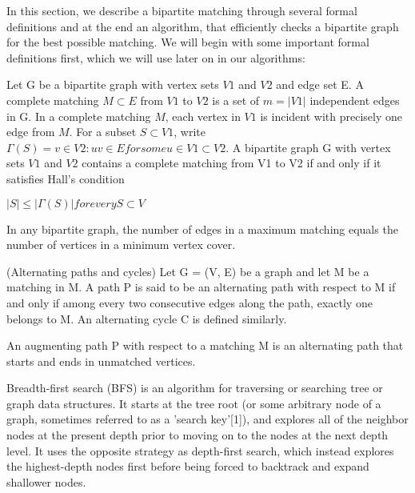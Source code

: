 In this section, we describe a bipartite matching through several formal definitions and at the end an algorithm, that efficiently checks a bipartite graph for the best possible matching. We will begin with some important formal definitions first, which we will use later on in our algorithms:

\begin{definition}
Let G be a bipartite graph with vertex sets $V1$ and $V2$ and edge set E. A complete
matching $M \subset E$ from $V1$ to $V2$ is a set of $m = |V1|$ independent edges in G. In a complete
matching $M$, each vertex in $V1$ is incident with precisely one edge from $M$.
For a subset $S \subset V1$, write \newline \newline
$\Gamma(S) = {v \in V2 : uv \in E for some u \in V1} \subset V2$.  \newline  \newline
A bipartite graph G with vertex sets $V1$ and $V2$ contains a complete matching
from V1 to V2 if and only if it satisfies Hall’s condition

$|S| \leq |\Gamma(S)|  for every S \subset V$
\end{definition}

\begin{definition}
In any bipartite graph, the number of edges in a maximum matching equals the number of vertices in a minimum vertex cover.
\end{definition}

\begin{definition}
(Alternating paths and cycles) Let G = (V, E) be a graph and let M be a matching in M. A path P is said to be an alternating path with respect to M if and only if among every two consecutive edges along the path, exactly one belongs to M. An alternating cycle C is defined similarly.

An augmenting path P with respect to a matching M is an alternating path that starts and ends in unmatched vertices.

\end{definition}

\begin{definition}

Breadth-first search (BFS) is an algorithm for traversing or searching tree or graph data structures. It starts at the tree root (or some arbitrary node of a graph, sometimes referred to as a 'search key'[1]), and explores all of the neighbor nodes at the present depth prior to moving on to the nodes at the next depth level.
It uses the opposite strategy as depth-first search, which instead explores the highest-depth nodes first before being forced to backtrack and expand shallower nodes.

\end{definition}

